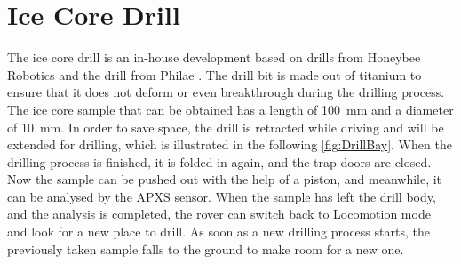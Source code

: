 \section{Ice Core Drill} \label{sec:IceCoreDrill}
The ice core drill is an in-house development based on drills from Honeybee Robotics \cite{Honeybee1} \cite{Honeybee2} and the drill from Philae \cite{PhilaeDrill}. The drill bit is made out of titanium to ensure that it does not deform or even breakthrough during the drilling process.
The ice core sample that can be obtained has a length of 100~mm and a diameter of 10~mm.
In order to save space, the drill is retracted while driving and will be extended for drilling, which is illustrated in the following \autoref{fig:DrillBay}.
When the drilling process is finished, it is folded in again, and the trap doors are closed.
Now the sample can be pushed out with the help of a piston, and meanwhile, it can be analysed by the APXS sensor. 
When the sample has left the drill body, and the analysis is completed, the rover can switch back to Locomotion mode and look for a new place to drill. As soon as a new drilling process starts, the previously taken sample falls to the ground to make room for a new one.


